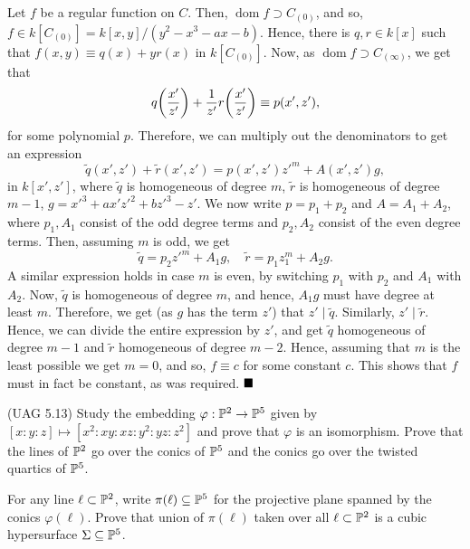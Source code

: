 \documentclass[12pt]{article}
\begin{document}
Let \( f \) be a regular function on \( C \). Then, \( \operatorname{dom} f \supset C_{(0)} \), and so, \( f \in k[C_{(0)}] = k[x,y]/(y^2-x^3-ax-b) \). Hence, there is \( q,r \in k[x] \) such that \( f(x,y) \equiv q(x) + y r(x) \) in \( k[C_{(0)}] \). Now, as \( \operatorname{dom} f \supset C_{(\infty)} \), we get that
\[
    q \qty(\frac{x'}{z'}) + \frac{1}{z'}r\qty(\frac{x'}{z'}) \equiv p(x',z'),
\]
for some polynomial \( p \). Therefore, we can multiply out the denominators to get an expression
\[
    \widetilde{q}(x',z') + \widetilde{r}(x',z') = p(x',z')z'^m + A(x',z')g,
\]
in \( k[x',z'] \), where \( \widetilde{q} \) is homogeneous of degree \( m \), \( \widetilde{r} \) is homogeneous of degree \( m-1 \), \( g = x'^3+ax'z'^2+bz'^3-z' \). We now write \( p = p_1+p_2 \) and \( A = A_1+A_2 \), where \( p_1,A_1 \) consist of the odd degree terms and \( p_2,A_2 \) consist of the even degree terms. Then, assuming \( m \) is odd, we get
\[
    \widetilde{q} = p_2z'^m + A_1g, \quad \widetilde{r} = p_1z_1^m + A_2g.
\]
A similar expression holds in case \( m \) is even, by switching \( p_1 \) with \( p_2 \) and \( A_1 \) with \( A_2 \). Now, \( \widetilde{q} \) is homogeneous of degree \( m \), and hence, \( A_1g \) must have degree at least \( m \). Therefore, we get (as \( g \) has the term \( z' \)) that \( z' \mid \widetilde{q}\). Similarly, \( z' \mid \widetilde{r} \). Hence, we can divide the entire expression by \( z' \), and get \( \widetilde{q} \) homogeneous of degree \( m-1 \) and \( \widetilde{r} \) homogeneous of degree \( m-2 \). Hence, assuming that \( m \) is the least possible we get \( m=0 \), and so, \( f \equiv c \) for some constant \( c \). This shows that \( f \) must in fact be constant, as was required. \(\hfill \blacksquare\)

\begin{prob} %
    (UAG 5.13) Study the embedding $\varphi : \mathbb{P}^2 \to \mathbb{P}^5$ given by $[x:y:z] \mapsto [x^2:xy:xz:y^2:yz:z^2]$ and prove that $\varphi$ is an isomorphism. Prove that the lines of $\mathbb{P}^2$ go over the conics of $\mathbb{P}^5$ and the conics go over the twisted quartics of $\mathbb{P}^5$.

    \vspace*{0.2cm}

    \noindent For any line $\ell \subset \mathbb{P}^2$, write $\pi(\ell) \subseteq \mathbb{P}^5$ for the projective plane spanned by the conics $\varphi(\ell)$. Prove that union of $\pi(\ell)$ taken over all $\ell \subset \mathbb{P}^2$ is a cubic hypersurface $\Sigma \subseteq \mathbb{P}^5$.
\end{prob}
\end{document}
